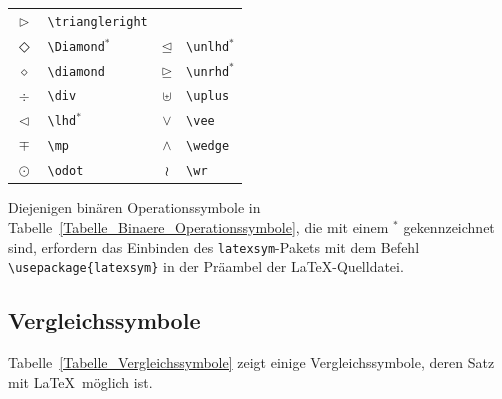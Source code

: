 \documentclass[a4paper,10pt,twoside]{scrbook}
\begin{document}
{\begin{table}[h!tb]
\begin{tabular}{clcl}
$\triangleright$ & \texttt{\textbackslash triangleright} \\
$\Diamond$ & \texttt{\textbackslash Diamond$^\ast$} &
$\unlhd$ & \texttt{\textbackslash unlhd$^\ast$} \\
$\diamond$ & \texttt{\textbackslash diamond} &
$\unrhd$ & \texttt{\textbackslash unrhd$^\ast$} \\
$\div$ & \texttt{\textbackslash div} &
$\uplus$ & \texttt{\textbackslash uplus} \\
$\lhd$ & \texttt{\textbackslash lhd$^\ast$} &
$\vee$ & \texttt{\textbackslash vee} \\
$\mp$ & \texttt{\textbackslash mp} &
$\wedge$ & \texttt{\textbackslash wedge} \\
$\odot$ & \texttt{\textbackslash odot} &
$\wr$ & \texttt{\textbackslash wr} \\
\hline
\end{tabular}
\end{table}


Diejenigen binären Operationssymbole in Tabelle~\ref{Tabelle_Binaere_Operationssymbole}, die mit einem $^\ast$ gekennzeichnet sind,
erfordern das Einbinden des \verb!latexsym!-Pakets mit dem Befehl 
\verb!\usepackage{latexsym}! in der Präambel der \LaTeX-Quelldatei.


\subsection{Vergleichssymbole}

Tabelle~\ref{Tabelle_Vergleichssymbole} zeigt einige 
Vergleichssymbole, deren Satz mit \LaTeX\ möglich ist.

}
\end{document}
